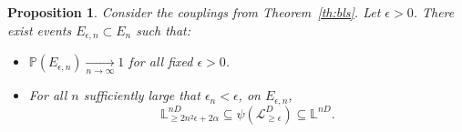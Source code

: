 \documentclass[11pt]{article}
\newtheorem{proposition}[theorem]{Proposition}
\begin{document}
\begin{proposition}
    \label{prop:blsBis}
    Consider the couplings from Theorem~\ref{th:bls}.
    Let $\epsilon>0$. There exist events $E_{\epsilon,n}\subset E_{n}$ such that:
    \begin{itemize}
    \item $\mathbb{P}(E_{\epsilon,n})\underset{n\to \infty}\longrightarrow 1$ for all fixed $\epsilon>0$.
    \item For all $n$ sufficiently large that $\epsilon_n<\epsilon$, on $E_{\epsilon,n}$,
    \begin{equation}
        \label{eq:temp:inclu}
        \mathbb{L}^{nD}_{\geq   2 n^2 \epsilon+2\alpha }\subseteq \psi( \mathcal{L}_{\geq \epsilon}^{D}) \subseteq \mathbb{L}^{nD}.
    \end{equation}
    \end{itemize}
\end{proposition}
\end{document}
